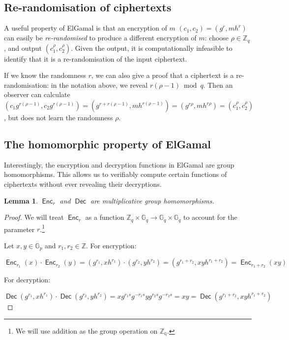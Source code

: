 \documentclass[11pt,twoside,a4paper]{article}
\DeclareMathOperator{\Enc}{\mathsf{Enc}}
\DeclareMathOperator{\Dec}{\mathsf{Dec}}
\newtheorem{lemma}[theorem]{Lemma}
\theoremstyle{definition}
\begin{document}
\subsection{Re-randomisation of ciphertexts}
A useful property of ElGamal is that an encryption of $m$ $(c_1, c_2)=(g^r, mh^r)$ can easily be \textit{re-randomised} to produce a different encryption of $m$: choose $\rho\in\mathbb{Z}_q$, and output $(c_1^\rho, c_2^\rho)$. Given the output, it is computationally infeasible to identify that it is a re-randomisation of the input ciphertext.

If we know the randomness $r$, we can also give a proof that a ciphertext is a re-randomisation: in the notation above, we reveal $r(\rho-1)\bmod q$. Then an observer can calculate $(c_1g^{r(\rho-1)}, c_2g^{r(\rho-1)})=(g^{r+r(\rho-1)}, mh^{r(\rho-1)})=(g^{r\rho}, mh^{r\rho})=(c_1^\rho, c_2^\rho)$, but does not learn the randomness $\rho$.
\subsection{The homomorphic property of ElGamal}
Interestingly, the encryption and decryption functions in ElGamal are group homomorphisms. This allows us to verifiably compute certain functions of ciphertexts without ever revealing their decryptions.
\begin{lemma}\label{lem-mul-homom}
    $\Enc_r$ and $\Dec$ are multiplicative group homomorphisms.
\end{lemma}
\begin{proof}
    We will treat $\Enc_r$ as a function $\mathbb{Z}_q\times\mathbb{G}_q\rightarrow\mathbb{G}_q\times\mathbb{G}_q$ to account for the parameter $r$.\footnote{We will use addition as the group operation on $\mathbb{Z_q}$.}

    Let $x,y\in\mathbb{G}_p$ and $r_1,r_2\in\mathbb{Z}$. For encryption:
    
    $$\Enc_{r_1}(x)\cdot\Enc_{r_2}(y)=(g^{r_1},xh^{r_1})\cdot(g^{r_2},yh^{r_2})=(g^{r_1+r_2},xyh^{r_1+r_2})=\Enc_{r_1+r_2}(xy)$$

    For decryption:

    $$\Dec(g^{r_1},xh^{r_1})\cdot\Dec(g^{r_2},yh^{r_2})=xg^{r_1s}g^{-r_1s}yg^{r_2s}g^{-r_2s}=xy=\Dec(g^{r_1+r_2},xyh^{r_1+r_2})$$
\end{proof}
\end{document}
